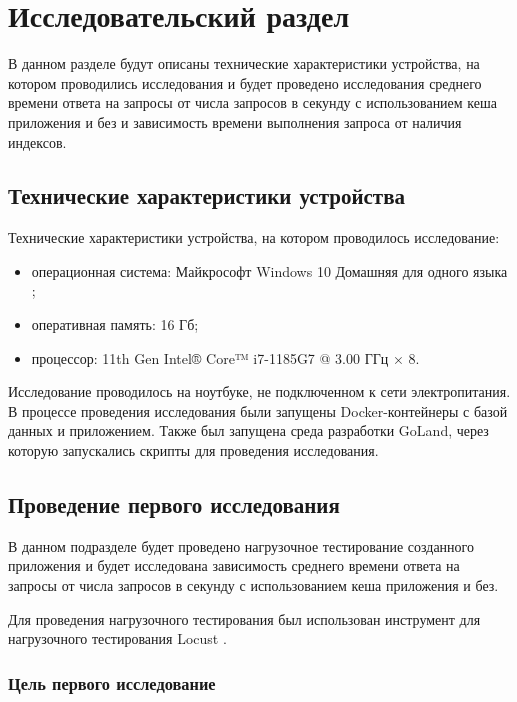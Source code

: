 \chapter{\label{research}Исследовательский раздел}

В данном разделе будут описаны технические характеристики устройства, на котором проводились исследования и будет проведено исследования среднего времени ответа на запросы от числа запросов в секунду с использованием кеша приложения и без и зависимость времени выполнения запроса от наличия индексов.

\section{Технические характеристики устройства}

Технические характеристики устройства, на котором проводилось исследование: 

\begin{itemize}[label=--]
	\item операционная система: Майкрософт Windows 10 Домашняя для одного языка \cite{info_ms_windows_home};
	\item оперативная память: 16 Гб;
	\item процессор: 11th Gen Intel® Core™ i7-1185G7 @ 3.00 ГГц × 8.
\end{itemize}

Исследование проводилось на ноутбуке, не подключенном к сети электропитания. В процессе проведения исследования были запущены Docker-контейнеры с базой данных и приложением. Также был запущена среда разработки GoLand, через которую запускались скрипты для проведения исследования.

\section{Проведение первого исследования}

В данном подразделе будет проведено нагрузочное тестирование созданного приложения и будет исследована зависимость среднего времени ответа на запросы от числа запросов в секунду с использованием кеша приложения и без.

Для проведения нагрузочного тестирования был использован инструмент для нагрузочного тестирования Locust \cite{info_locust}.


\subsection{Цель первого исследование}

